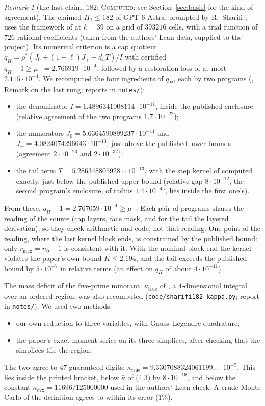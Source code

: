 \documentclass[11pt]{amsart}
\theoremstyle{definition}
\theoremstyle{remark}
\newtheorem{remark}[theorem]{Remark}
\newcommand{\lbl}[1]{\textup{\textsc{#1}}}
\begin{document}
\begin{remark}[the last claim, $182$; \lbl{Computed}; see Section~\ref{sec:basis} for the kind of agreement]\label{rem:182}
The claimed $H_1\le182$ of GPT-6 Astra, prompted by R.~Sharifi \cite{Sha26},
uses the framework of \cite{OAI26} at $k=39$ on a grid of $393216$ cells, with
a trial function of $726$ rational coefficients (taken from the authors' Lean
data, supplied to the project). Its numerical criterion is a cap quotient
$q_H=\rho^*(J_0+(1-\ell)J_+-d_hT)/I$ with certified $q_H-1\ge\mu^-=2.766919\cdot10^{-4}$,
followed by a restoration loss of at most $2.115\cdot10^{-4}$. We recomputed
the four ingredients of $q_H$, each by two programs (\cite{Kim26}, Remark on
the last rung; reports in \texttt{notes/}):
\begin{itemize}
\item the denominator $I=1.4896341008114\cdot10^{-11}$, inside the published
  enclosure (relative agreement of the two programs $1.7\cdot10^{-22}$);
\item the numerators $J_0=5.6364590899237\cdot10^{-11}$ and
  $J_+=4.0824074296643\cdot10^{-13}$, just above the published lower bounds
  (agreement $2\cdot10^{-23}$ and $2\cdot10^{-32}$);
\item the tail term $T=5.2863488059281\cdot10^{-13}$, with the step kernel of
  \cite[(5.5)--(5.6)]{Sha26} computed exactly, just below the published upper
  bound (relative gap $8\cdot10^{-12}$; the second program's enclosure, of
  radius $1.4\cdot10^{-45}$, lies inside the first one's).
\end{itemize}
From these, $q_H-1=2.767059\cdot10^{-4}\ge\mu^-$. Each pair of programs shares the reading of the source (cap layers, face
mask, and for the tail the layered derivation), so they check arithmetic and
code, not that reading. One point of the reading, where the last kernel block
ends, is constrained by the published bound: only $r_{\max}=n_0-1$ is
consistent with it. With the nominal block end the kernel violates the paper's
own bound $K\le2.194$, and the tail exceeds the published bound by $5\cdot10^{-7}$
in relative terms (an effect on $q_H$ of about $4\cdot10^{-11}$).

The mass deficit of the five-prime minorant, $\kappa_{\mathrm{true}}$ of
\cite[(4.2)]{Sha26}, a $4$-dimensional integral over an ordered region, was
also recomputed (\texttt{code/sharifi182\_kappa.py}; report in
\texttt{notes/}). We used two methods:
\begin{itemize}
\item our own reduction to three variables, with Gauss--Legendre quadrature;
\item the paper's exact moment series on its three simplices, after checking
  that the simplices tile the region.
\end{itemize}
The two agree to $47$ guaranteed digits:
$\kappa_{\mathrm{true}}=9.3307088324061199\ldots\cdot10^{-5}$. This lies inside
the printed bracket, below $\bar\kappa$ of (4.3) by $8\cdot10^{-19}$, and below
the constant $\kappa_{\mathrm{cvx}}=11696/125000000$ used in the authors' Lean
check. A crude Monte Carlo of the definition agrees to within its error
($1\%$).


\end{remark}
\end{document}
